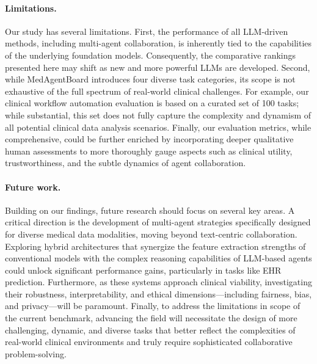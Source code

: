 \documentclass{article}
\begin{document}
\paragraph{Limitations.}
Our study has several limitations. First, the performance of all LLM-driven methods, including multi-agent collaboration, is inherently tied to the capabilities of the underlying foundation models. Consequently, the comparative rankings presented here may shift as new and more powerful LLMs are developed. Second, while MedAgentBoard introduces four diverse task categories, its scope is not exhaustive of the full spectrum of real-world clinical challenges. For example, our clinical workflow automation evaluation is based on a curated set of 100 tasks; while substantial, this set does not fully capture the complexity and dynamism of all potential clinical data analysis scenarios. Finally, our evaluation metrics, while comprehensive, could be further enriched by incorporating deeper qualitative human assessments to more thoroughly gauge aspects such as clinical utility, trustworthiness, and the subtle dynamics of agent collaboration.

\paragraph{Future work.}
Building on our findings, future research should focus on several key areas. A critical direction is the development of multi-agent strategies specifically designed for diverse medical data modalities, moving beyond text-centric collaboration. Exploring hybrid architectures that synergize the feature extraction strengths of conventional models with the complex reasoning capabilities of LLM-based agents could unlock significant performance gains, particularly in tasks like EHR prediction. Furthermore, as these systems approach clinical viability, investigating their robustness, interpretability, and ethical dimensions—including fairness, bias, and privacy—will be paramount. Finally, to address the limitations in scope of the current benchmark, advancing the field will necessitate the design of more challenging, dynamic, and diverse tasks that better reflect the complexities of real-world clinical environments and truly require sophisticated collaborative problem-solving.
\end{document}
